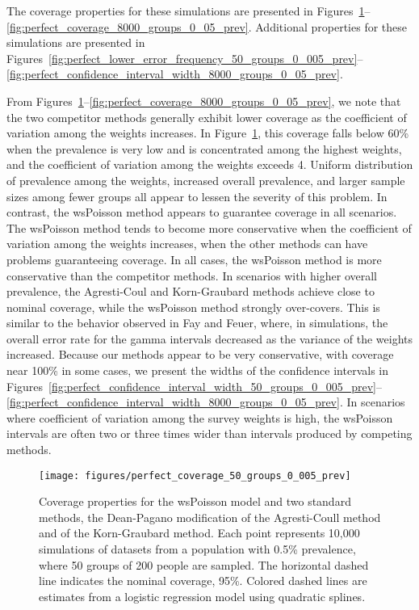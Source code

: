 The coverage properties for these simulations are presented in Figures~\ref{fig:perfect_coverage_50_groups_0_005_prev}--\ref{fig:perfect_coverage_8000_groups_0_05_prev}.
Additional properties for these simulations are presented in Figures~\ref{fig:perfect_lower_error_frequency_50_groups_0_005_prev}--\ref{fig:perfect_confidence_interval_width_8000_groups_0_05_prev}.

From Figures~\ref{fig:perfect_coverage_50_groups_0_005_prev}--\ref{fig:perfect_coverage_8000_groups_0_05_prev}, we note that the two competitor methods generally exhibit lower coverage as the coefficient of variation among the weights increases.
In Figure~\ref{fig:perfect_coverage_50_groups_0_005_prev}, this coverage falls below 60\% when the prevalence is very low and is concentrated among the highest weights, and the coefficient of variation among the weights exceeds 4.
Uniform distribution of prevalence among the weights, increased overall prevalence, and larger sample sizes among fewer groups all appear to lessen the severity of this problem.
In contrast, the wsPoisson method appears to guarantee coverage in all scenarios.
The wsPoisson method tends to become more conservative when the coefficient of variation among the weights increases, when the other methods can have problems guaranteeing coverage.
In all cases, the wsPoisson method is more conservative than the competitor methods.
In scenarios with higher overall prevalence, the Agresti-Coul and Korn-Graubard methods achieve close to nominal coverage, while the wsPoisson method strongly over-covers.
This is similar to the behavior observed in Fay and Feuer,\cite{FayF:1997} where, in simulations, the overall error rate for the gamma intervals decreased as the variance of the weights increased.
Because our methods appear to be very conservative, with coverage near 100\% in some cases, we present the widths of the confidence intervals in Figures~\ref{fig:perfect_confidence_interval_width_50_groups_0_005_prev}--\ref{fig:perfect_confidence_interval_width_8000_groups_0_05_prev}.
In scenarios where coefficient of variation among the survey weights is high, the wsPoisson intervals are often two or three times wider than intervals produced by competing methods.


\begin{figure}
\centering
\texttt{[image: figures/perfect\_coverage\_50\_groups\_0\_005\_prev]}
\caption{Coverage properties for the wsPoisson model and two standard methods, the Dean-Pagano modification of the Agresti-Coull method and of the Korn-Graubard method.
Each point represents 10,000 simulations of datasets from a population with 0.5\% prevalence, where 50 groups of 200 people are sampled.
The horizontal dashed line indicates the nominal coverage, 95\%.
Colored dashed lines are estimates from a logistic regression model using quadratic splines.}
\label{fig:perfect_coverage_50_groups_0_005_prev}
\end{figure}

